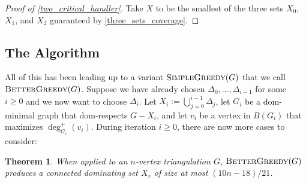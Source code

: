 \documentclass{article}
\newcommand{\pat}[1]{\textcolor{red}{PM: #1}}
\newcommand{\hussein}[1]{\textcolor{purple}{HH: #1}}
\newtheorem{thm}{Theorem}
\theoremstyle{definition}
\begin{document}
\begin{proof}[Proof of \cref{two_critical_handler}]
  Take $X$ to be the smallest of the three sets $X_0$, $X_1$, and $X_2$ guaranteed by \cref{three_sets_coverage}.
\end{proof}


\subsection{The Algorithm}


All of this has been leading up to a variant  $\textsc{SimpleGreedy}(G)$ that we call $\textsc{BetterGreedy}(G)$.  Suppose we have already chosen $\Delta_0,\ldots,\Delta_{i-1}$ for some $i\ge 0$ and we now want to choose $\Delta_i$.  Let $X_i:=\bigcup_{j=0}^{i-1}\Delta_j$, let $G_i$ be a dom-minimal graph that dom-respects $G-X_i$, and let $v_i$ be a vertex in $B(G_i)$ that maximizes $\deg^+_{G_i}(v_i)$.  During iteration $i\ge 0$, there are now more cases to consider:

\begin{thm}\label{better_greedy}
  When applied to an $n$-vertex triangulation $G$,  $\textsc{BetterGreedy}(G)$ produces a connected dominating set $X_r$ of size at most $(10n-18)/21$.
\end{thm}
\end{document}
